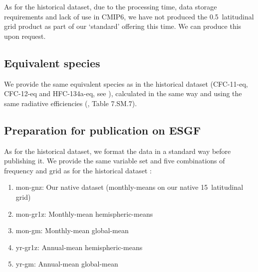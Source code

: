 As for the historical dataset, due to the processing time, data storage requirements and lack of use in CMIP6,
we have not produced the 0.5\textdegree~latitudinal grid product as part of our `standard' offering this time.
We can produce this upon request.

\subsection{Equivalent species}
\label{ssec:methods-equivalent-species}

We provide the same equivalent species as in the historical dataset
(CFC-11-eq, CFC-12-eq and HFC-134a-eq, see \citealp{nicholls_historical-ghgs_2026}),
calculated in the same way
and using the same radiative efficiencies
(\citealp{IPCC_AR6-WG1-Ch-7-SM_2021}, Table 7.SM.7).

\subsection{Preparation for publication on ESGF}
\label{ssec:prep-for-esgf}

As for the historical dataset,
we format the data in a standard way before publishing it.
We provide the same variable set and five combinations of frequency and grid
as for the historical dataset \citep{nicholls_historical-ghgs_2026}:

\begin{enumerate}
    \item mon-gnz: Our native dataset (monthly-means on our native 15\textdegree~latitudinal grid)
    \item mon-gr1z: Monthly-mean hemispheric-means
    \item mon-gm: Monthly-mean global-mean
    \item yr-gr1z: Annual-mean hemispheric-means
    \item yr-gm: Annual-mean global-mean
\end{enumerate}

